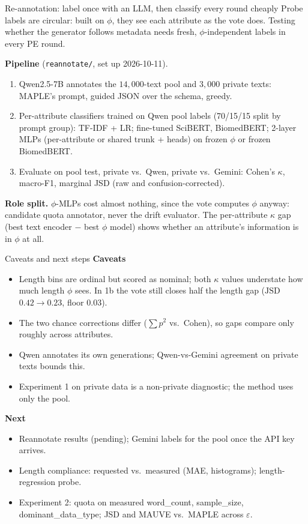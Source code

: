 \documentclass[11pt,aspectratio=169]{beamer}
\begin{document}
\begin{frame}{Re-annotation: label once with an LLM, then classify every round cheaply}
Probe labels are circular: built on $\phi$, they see each attribute as the vote does. Testing whether the generator follows metadata needs fresh, $\phi$-independent labels in every PE round.

\medskip
\textbf{Pipeline} (\texttt{reannotate/}, set up 2026-10-11).
\begin{enumerate}\small
  \item Qwen2.5-7B annotates the $14{,}000$-text pool and $3{,}000$ private texts: MAPLE's prompt, guided JSON over the schema, greedy.
  \item Per-attribute classifiers trained on Qwen pool labels (70/15/15 split by prompt group):
        TF-IDF + LR; fine-tuned SciBERT, BiomedBERT; 2-layer MLPs (per-attribute or shared trunk + heads) on frozen $\phi$ or frozen BiomedBERT.
  \item Evaluate on pool test, private vs.\ Qwen, private vs.\ Gemini: Cohen's $\kappa$, macro-F1, marginal JSD (raw and confusion-corrected).
\end{enumerate}

\medskip
\textbf{Role split.} $\phi$-MLPs cost almost nothing, since the vote computes $\phi$ anyway: candidate \alert{quota annotator}, never the drift evaluator. The per-attribute $\kappa$ gap (best text encoder $-$ best $\phi$ model) shows whether an attribute's information is in $\phi$ at all.
\end{frame}

\begin{frame}{Caveats and next steps}
\textbf{Caveats}
\begin{itemize}\small
  \item Length bins are ordinal but scored as nominal; both $\kappa$ values understate how much length $\phi$ sees. In 1b the vote still closes half the length gap ($\mathrm{JSD}$ $0.42 \to 0.23$, floor $0.03$).
  \item The two chance corrections differ ($\sum p^2$ vs.\ Cohen), so gaps compare only roughly across attributes.
  \item Qwen annotates its own generations; Qwen-vs-Gemini agreement on private texts bounds this.
  \item Experiment 1 on private data is a non-private diagnostic; the method uses only the pool.
\end{itemize}

\medskip
\textbf{Next}
\begin{itemize}\small
  \item Reannotate results (pending); Gemini labels for the pool once the API key arrives.
  \item Length compliance: requested vs.\ measured (MAE, histograms); length-regression probe.
  \item Experiment 2: quota on measured word\_count, sample\_size, dominant\_data\_type; JSD and MAUVE vs.\ MAPLE across $\varepsilon$.
\end{itemize}
\end{frame}
\end{document}

